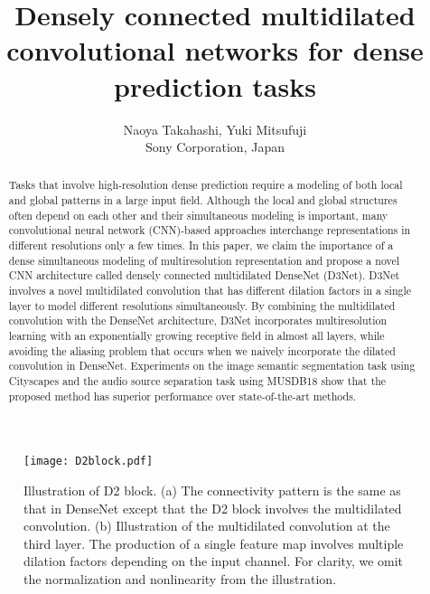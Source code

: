 \documentclass[final]{cvpr}
\begin{document}
\title{Densely connected multidilated convolutional networks for dense prediction tasks}


\author{Naoya Takahashi, Yuki Mitsufuji\\
Sony Corporation, Japan\\
}

\maketitle



\begin{abstract}
Tasks that involve high-resolution dense prediction require a modeling of both local and global patterns in a large input field. 
Although the local and global structures often depend on each other and their simultaneous modeling is important, many convolutional neural network (CNN)-based approaches interchange representations in different resolutions only a few times. 
In this paper, we claim the importance of a dense simultaneous modeling of multiresolution representation and propose a novel CNN architecture called densely connected multidilated DenseNet (D3Net).
D3Net involves a novel multidilated convolution that has different dilation factors in a single layer to model different resolutions simultaneously. 
By combining the multidilated convolution with the DenseNet architecture, D3Net incorporates multiresolution learning with an exponentially growing receptive field in almost all layers, while avoiding the aliasing problem that occurs when we naively incorporate the dilated convolution in DenseNet.
Experiments on the image semantic segmentation task using Cityscapes and the audio source separation task using MUSDB18 show that the proposed method has superior performance over state-of-the-art methods.



\end{abstract}

\begin{figure*}[t]
  \centering
  \texttt{[image: D2block.pdf]}
  \caption{Illustration of D2 block. (a) The connectivity pattern is the same as that in DenseNet except that the D2 block involves the multidilated convolution. (b) Illustration of the multidilated convolution at the third layer. The production of a single feature map involves multiple dilation factors depending on the input channel. For clarity, we omit the normalization and nonlinearity from the illustration.
}
  \label{fig:d2block}
\end{figure*}
\end{document}
